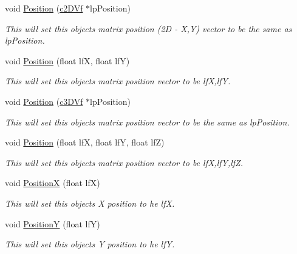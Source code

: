 \begin{DoxyCompactItemize}
void \hyperlink{classc_camera_matrix4_a62fa2879539cc733e661d02b8a898578}{Position} (\hyperlink{classc2_d_vf}{c2DVf} $\ast$lpPosition)
\begin{DoxyCompactList}\small\item\em This will set this objects matrix position (2D -\/ X,Y) vector to be the same as lpPosition. \item\end{DoxyCompactList}\item 
void \hyperlink{classc_camera_matrix4_a293ac7d2919eae7205b568ea56fa104c}{Position} (float lfX, float lfY)
\begin{DoxyCompactList}\small\item\em This will set this objects matrix position vector to be lfX,lfY. \item\end{DoxyCompactList}\item 
void \hyperlink{classc_camera_matrix4_a7110b0f3aa924a2cfefe8ca149e0b41f}{Position} (\hyperlink{classc3_d_vf}{c3DVf} $\ast$lpPosition)
\begin{DoxyCompactList}\small\item\em This will set this objects matrix position vector to be the same as lpPosition. \item\end{DoxyCompactList}\item 
void \hyperlink{classc_camera_matrix4_a1aa471464a30ce27fe339b743b840516}{Position} (float lfX, float lfY, float lfZ)
\begin{DoxyCompactList}\small\item\em This will set this objects matrix position vector to be lfX,lfY,lfZ. \item\end{DoxyCompactList}\item 
void \hyperlink{classc_camera_matrix4_af130ddef040458f01b9a2365f41c567a}{PositionX} (float lfX)
\begin{DoxyCompactList}\small\item\em This will set this objects X position to he lfX. \item\end{DoxyCompactList}\item 
void \hyperlink{classc_camera_matrix4_adce3f6365faf3af907994f50c004c736}{PositionY} (float lfY)
\begin{DoxyCompactList}\small\item\em This will set this objects Y position to he lfY. \item\end{DoxyCompactList}\item 

\end{DoxyCompactItemize}
